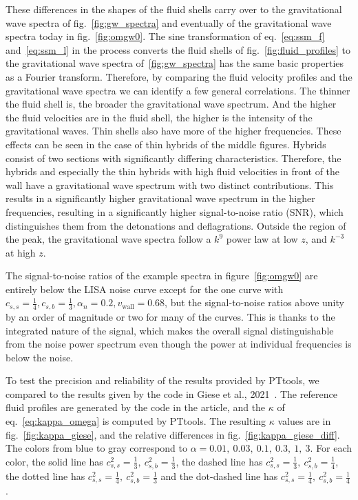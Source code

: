 These differences in the shapes of the fluid shells carry over to the gravitational wave spectra of fig.~\ref{fig:gw_spectra}
and eventually of the gravitational wave spectra today in fig.~\ref{fig:omgw0}.
The sine transformation of eq.~\eqref{eq:ssm_f} and~\eqref{eq:ssm_l} in the process converts the fluid shells of fig.~\ref{fig:fluid_profiles}
to the gravitational wave spectra of~\ref{fig:gw_spectra} has the same basic properties as a Fourier transform.
Therefore, by comparing the fluid velocity profiles and the gravitational wave spectra we can identify a few general correlations.
The thinner the fluid shell is, the broader the gravitational wave spectrum.
And the higher the fluid velocities are in the fluid shell, the higher is the intensity of the gravitational waves.
Thin shells also have more of the higher frequencies.
These effects can be seen in the case of thin hybrids of the middle figures.
Hybrids consist of two sections with significantly differing characteristics.
Therefore, the hybrids and especially the thin hybrids with high fluid velocities in front of the wall have a gravitational wave spectrum with two distinct contributions.
This results in a significantly higher gravitational wave spectrum in the higher frequencies,
resulting in a significantly higher signal-to-noise ratio (SNR),
which distinguishes them from the detonations and deflagrations.
Outside the region of the peak, the gravitational wave spectra follow a $k^9$ power law at low $z$,
and $k^{-3}$ at high $z$.

The signal-to-noise ratios of the example spectra in figure~\ref{fig:omgw0}
are entirely below the LISA noise curve except for the one curve with
$c_{s,s} = \frac{1}{4}, c_{s,b} = \frac{1}{3}, \alpha_n = 0.2, v_\text{wall} = 0.68$,
but the signal-to-noise ratios above unity by an order of magnitude or two for many of the curves.
This is thanks to the integrated nature of the signal,
which makes the overall signal distinguishable from the noise power spectrum
even though the power at individual frequencies is below the noise.
\cite{thrane_sensitivity_2013}


To test the precision and reliability of the results provided by PTtools,
we compared to the results given by the code in  Giese et al., 2021~\cite[fig. 2]{giese_2021}.
The reference fluid profiles are generated by the code in the article,
and the $\kappa$ of eq.~\eqref{eq:kappa_omega} is computed by PTtools.
The resulting $\kappa$ values are in fig.~\ref{fig:kappa_giese},
and the relative differences in fig.~\ref{fig:kappa_giese_diff}.
The colors from blue to gray correspond to $\alpha = 0.01, \ 0.03, \ 0.1, \ 0.3, \ 1, \ 3$.
For each color, the solid line has $c_{s,s}^2 = \frac{1}{3}, \ c_{s,b}^2 = \frac{1}{3}$,
the dashed line has $c_{s,s}^2 = \frac{1}{3}, \ c_{s,b}^2 = \frac{1}{4}$,
the dotted line has $c_{s,s}^2 = \frac{1}{4}, \ c_{s,b}^2 = \frac{1}{3}$
and the dot-dashed line has $c_{s,s}^2 = \frac{1}{4}, \ c_{s,b}^2 = \frac{1}{4}$.


